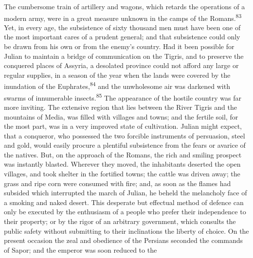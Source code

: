 

The cumbersome train of artillery and wagons, which retards the
operations of a modern army, were in a great measure unknown in
the camps of the Romans.\textsuperscript{83} Yet, in every age, the subsistence of
sixty thousand men must have been one of the most important cares
of a prudent general; and that subsistence could only be drawn
from his own or from the enemy’s country. Had it been possible
for Julian to maintain a bridge of communication on the Tigris,
and to preserve the conquered places of Assyria, a desolated
province could not afford any large or regular supplies, in a
season of the year when the lands were covered by the inundation
of the Euphrates,\textsuperscript{84} and the unwholesome air was darkened with
swarms of innumerable insects.\textsuperscript{85} The appearance of the hostile
country was far more inviting. The extensive region that lies
between the River Tigris and the mountains of Media, was filled
with villages and towns; and the fertile soil, for the most part,
was in a very improved state of cultivation. Julian might expect,
that a conqueror, who possessed the two forcible instruments of
persuasion, steel and gold, would easily procure a plentiful
subsistence from the fears or avarice of the natives. But, on the
approach of the Romans, the rich and smiling prospect was
instantly blasted. Wherever they moved, the inhabitants deserted
the open villages, and took shelter in the fortified towns; the
cattle was driven away; the grass and ripe corn were consumed
with fire; and, as soon as the flames had subsided which
interrupted the march of Julian, he beheld the melancholy face of
a smoking and naked desert. This desperate but effectual method
of defence can only be executed by the enthusiasm of a people who
prefer their independence to their property; or by the rigor of
an arbitrary government, which consults the public safety without
submitting to their inclinations the liberty of choice. On the
present occasion the zeal and obedience of the Persians seconded
the commands of Sapor; and the emperor was soon reduced to the
